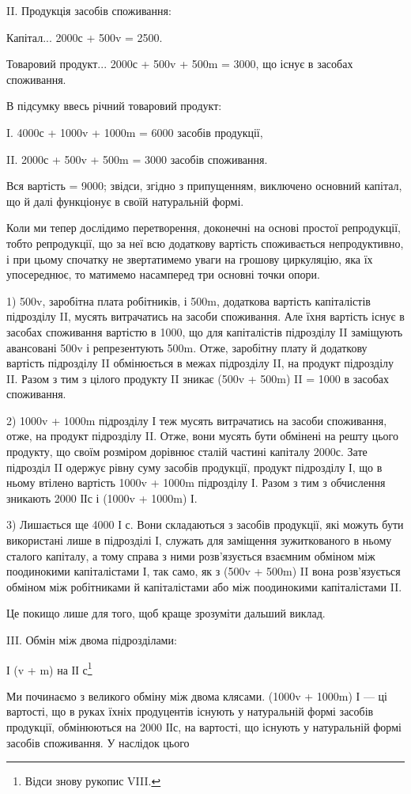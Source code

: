 \parcont{}  %
II. Продукція засобів споживання:

Капітал... 2000с + 500v = 2500.

Товаровий продукт... 2000с + 500v + 500m = 3000, що існує в
засобах споживання.

В підсумку ввесь річний товаровий продукт:

I.    4000с + 1000v + 1000m = 6000 засобів продукції,

II.    2000с + 500v + 500m = 3000 засобів споживання.

Вся вартість = 9000; звідси, згідно з припущенням, виключено основний
капітал, що й далі функціонує в своїй натуральній формі.

Коли ми тепер дослідимо перетворення, доконечні на основі простої
репродукції, тобто репродукції, що за неї всю додаткову вартість
споживається непродуктивно, і при цьому спочатку не звертатимемо уваги
на грошову циркуляцію, яка їх упосереднює, то матимемо насамперед
три основні точки опори.

1) 500v, заробітна плата робітників, і 500m, додаткова вартість капіталістів
підрозділу II, мусять витрачатись на засоби споживання. Але
їхня вартість існує в засобах споживання вартістю в 1000, що для капіталістів
підрозділу II заміщують авансовані 500v і репрезентують 500m.
Отже, заробітну плату й додаткову вартість підрозділу II обмінюється
в межах підрозділу II, на продукт підрозділу II. Разом з тим з цілого
продукту II зникає (500v + 500m) II = 1000 в засобах споживання.

2) 1000v + 1000m підрозділу І теж мусять витрачатись на засоби
споживання, отже, на продукт підрозділу II. Отже, вони мусять бути обмінені
на решту цього продукту, що своїм розміром дорівнює сталій
частині капіталу 2000с. Зате підрозділ II одержує рівну суму засобів
продукції, продукт підрозділу І, що в ньому втілено вартість 1000v +
1000m підрозділу І. Разом з тим з обчислення зникають 2000 ІІс і
(1000v + 1000m) І.

3) Лишається ще 4000 І с. Вони складаються з засобів продукції, які
можуть бути використані лише в підрозділі І, служать для заміщення
зужиткованого в ньому сталого капіталу, а тому справа з ними розв’язується
взаємним обміном між поодинокими капіталістами І, так само, як
з (500v + 500m) II вона розв’язується обміном між робітниками й капіталістами
або між поодинокими капіталістами II.

Це покищо лише для того, щоб краще зрозуміти дальший виклад.

III. Обмін між двома підрозділами:

І (v + m) на ІІ с\footnote{
Відси знову рукопис VIII.
}

Ми починаємо з великого обміну між двома клясами. (1000v +
1000m) І — ці вартості, що в руках їхніх продуцентів існують у натуральній
формі засобів продукції, обмінюються на 2000 ІІс, на вартості,
що існують у натуральній формі засобів споживання. У наслідок цього
\parbreak{}  %
